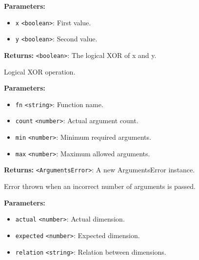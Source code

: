 \documentclass[12pt,a4paper]{article}
\begin{document}
\vspace{5mm}
\noindent {}


\noindent \textbf{Parameters:}
\begin{itemize}
  \item \texttt{x} \texttt{<boolean>}: First value.
  \item \texttt{y} \texttt{<boolean>}: Second value.
\end{itemize}

\noindent \textbf{Returns:} \texttt{<boolean>}: The logical XOR of x and y.

\noindent Logical XOR operation.

\vspace{5mm}
\noindent {}


\noindent \textbf{Parameters:}
\begin{itemize}
  \item \texttt{fn} \texttt{<string>}: Function name.
  \item \texttt{count} \texttt{<number>}: Actual argument count.
  \item \texttt{min} \texttt{<number>}: Minimum required arguments.
  \item \texttt{max} \texttt{<number>}: Maximum allowed arguments.
\end{itemize}

\noindent \textbf{Returns:} \texttt{<ArgumentsError>}: A new ArgumentsError instance.

\noindent Error thrown when an incorrect number of arguments is passed.

\vspace{5mm}
\noindent {}


\noindent \textbf{Parameters:}
\begin{itemize}
  \item \texttt{actual} \texttt{<number>}: Actual dimension.
  \item \texttt{expected} \texttt{<number>}: Expected dimension.
  \item \texttt{relation} \texttt{<string>}: Relation between dimensions.
\end{itemize}
\end{document}
